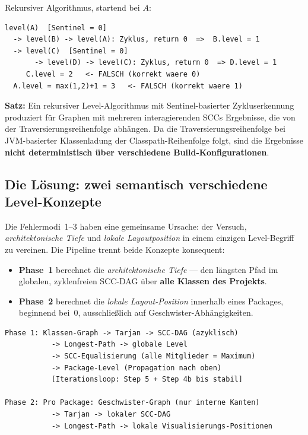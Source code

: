 \documentclass[a4paper,twoside]{article}
\begin{document}
Rekursiver Algorithmus, startend bei $A$:

\begin{verbatim}
level(A)  [Sentinel = 0]
  -> level(B) -> level(A): Zyklus, return 0  =>  B.level = 1
  -> level(C)  [Sentinel = 0]
       -> level(D) -> level(C): Zyklus, return 0  => D.level = 1
     C.level = 2   <- FALSCH (korrekt waere 0)
  A.level = max(1,2)+1 = 3   <- FALSCH (korrekt waere 1)
\end{verbatim}

\textbf{Satz:} Ein rekursiver Level-Algorithmus mit Sentinel-basierter
Zykluserkennung produziert f\"{u}r Graphen mit mehreren interagierenden SCCs
Ergebnisse, die von der Traversierungsreihenfolge abh\"{a}ngen.
Da die Traversierungsreihenfolge bei JVM-basierter Klassenladung der
Classpath-Reihenfolge folgt, sind die Ergebnisse \textbf{nicht deterministisch
\"{u}ber verschiedene Build-Konfigurationen}.

\subsection*{Die L\"{o}sung: zwei semantisch verschiedene Level-Konzepte}

Die Fehlermodi~1--3 haben eine gemeinsame Ursache: der Versuch,
\emph{architektonische Tiefe} und \emph{lokale Layoutposition} in einem einzigen
Level-Begriff zu vereinen. Die Pipeline trennt beide Konzepte konsequent:

\begin{itemize}
  \item \textbf{Phase~1} berechnet die \emph{architektonische Tiefe} --- den
        l\"{a}ngsten Pfad im globalen, zyklenfreien SCC-DAG \"{u}ber
        \textbf{alle Klassen des Projekts}.
  \item \textbf{Phase~2} berechnet die \emph{lokale Layout-Position} innerhalb
        eines Packages, beginnend bei~0, ausschlie{\ss}lich auf
        Geschwister-Abh\"{a}ngigkeiten.
\end{itemize}

\begin{verbatim}
Phase 1: Klassen-Graph -> Tarjan -> SCC-DAG (azyklisch)
           -> Longest-Path -> globale Level
           -> SCC-Equalisierung (alle Mitglieder = Maximum)
           -> Package-Level (Propagation nach oben)
           [Iterationsloop: Step 5 + Step 4b bis stabil]

Phase 2: Pro Package: Geschwister-Graph (nur interne Kanten)
           -> Tarjan -> lokaler SCC-DAG
           -> Longest-Path -> lokale Visualisierungs-Positionen
\end{verbatim}
\end{document}
